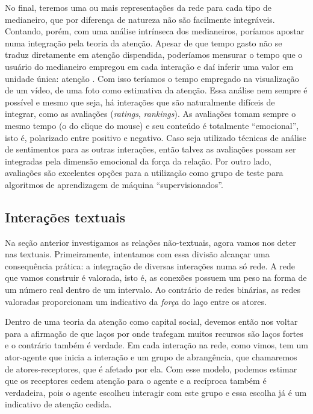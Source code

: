 \documentclass{article}
\begin{document}
No final, teremos uma ou mais representações da rede para cada tipo de
medianeiro, que por diferença de natureza não são facilmente integráveis.
Contando, porém, com uma análise intrínseca dos medianeiros, poríamos apostar
numa integração pela teoria da atenção. Apesar de que tempo gasto não se traduz
diretamente em atenção dispendida, poderíamos mensurar o tempo que o usuário do
medianeiro empregou em cada interação e daí inferir uma valor em unidade única:
atenção \cite{Davenport2001}. Com isso teríamos o tempo empregado na visualização
de um vídeo, de uma foto como estimativa da atenção. Essa análise nem sempre é
possível e mesmo que seja, há interações que são naturalmente difíceis de
integrar, como as avaliações (\textit{ratings}, \textit{rankings}). As avaliações
tomam sempre o mesmo tempo (o do clique do mouse) e seu conteúdo é totalmente
``emocional'', isto é, polarizado entre positivo e negativo. Caso seja utilizado
técnicas de análise de sentimentos para as outras interações, então talvez as
avaliações possam ser integradas pela dimensão emocional da força da relação.
Por outro lado, avaliações são excelentes opções para a utilização como grupo
de teste para algoritmos de aprendizagem de máquina ``supervisionados''.

\subsection{Interações textuais}

Na seção anterior investigamos as relações não-textuais, agora vamos nos deter
nas textuais. Primeiramente, intentamos com essa divisão alcançar uma
consequência prática: a integração de diversas interações numa só rede. A rede
que vamos construir é valorada, isto é, as conexões possuem um peso na forma de
um número real dentro de um intervalo. Ao contrário de redes binárias, as redes
valoradas proporcionam um indicativo da \textit{força} do laço entre os atores.

Dentro de uma teoria da atenção como capital social, devemos então nos voltar
para a afirmação de que laços por onde trafegam muitos recursos são laços fortes
e o contrário também é verdade. Em cada interação na rede, como vimos, tem um
ator-agente que inicia a interação e um grupo de abrangência, que chamaremos de
atores-receptores, que é afetado por ela. Com esse modelo, podemos estimar que
os receptores cedem atenção para o agente e a recíproca também é verdadeira,
pois o agente escolheu interagir com este grupo e essa escolha já é um
indicativo de atenção cedida.
\end{document}
